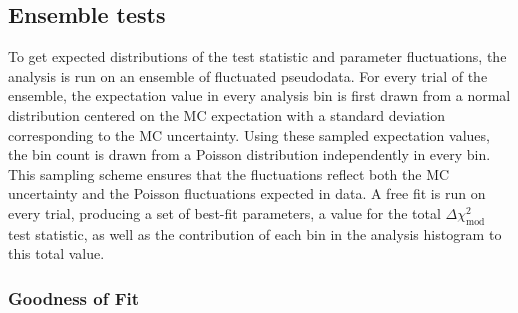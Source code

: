 \subsection{Ensemble tests}
\label{sec:three-flavor-ensemble}
To get expected distributions of the test statistic and parameter fluctuations, the analysis is run on an ensemble of fluctuated pseudodata. For every trial of the ensemble, the expectation value in every analysis bin is first drawn from a normal distribution centered on the MC expectation with a standard deviation corresponding to the MC uncertainty. Using these sampled expectation values, the bin count is drawn from a Poisson distribution independently in every bin. This sampling scheme ensures that the fluctuations reflect both the MC uncertainty and the Poisson fluctuations expected in data. A free fit is run on every trial, producing a set of best-fit parameters, a value for the total $\Delta \chi^2_{\mathrm{mod}}$ test statistic, as well as the contribution of each bin in the analysis histogram to this total value.



\subsubsection{Goodness of Fit}

